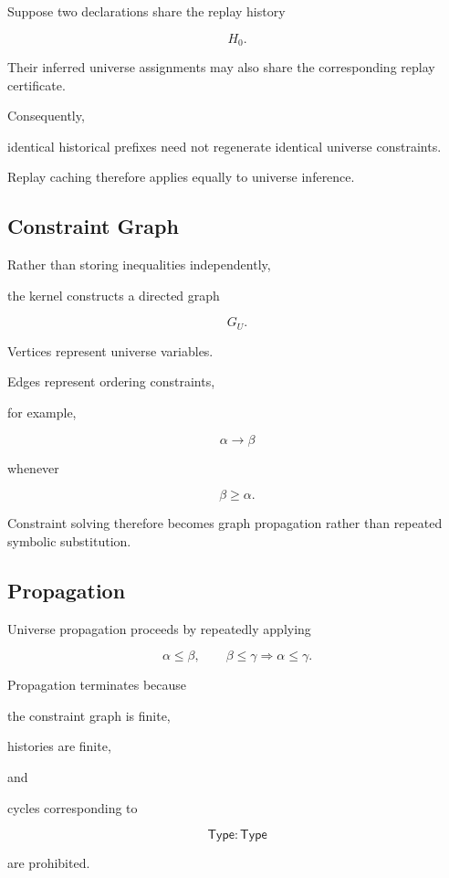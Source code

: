 \documentclass[12pt,oneside]{article}
\theoremstyle{definition}
\theoremstyle{remark}
\newcommand{\Type}{\mathsf{Type}}
\begin{document}
Suppose two declarations share the replay history

\[
H_0.
\]

Their inferred universe assignments may also share the corresponding replay
certificate.

Consequently,

identical historical prefixes need not regenerate identical universe
constraints.

Replay caching therefore applies equally to universe inference.


\subsection{Constraint Graph}

Rather than storing inequalities independently,

the kernel constructs a directed graph

\[
G_U.
\]

Vertices represent universe variables.

Edges represent ordering constraints,

for example,

\[
\alpha
\rightarrow
\beta
\]

whenever

\[
\beta
\geq
\alpha.
\]

Constraint solving therefore becomes graph propagation rather than repeated
symbolic substitution.


\subsection{Propagation}

Universe propagation proceeds by repeatedly applying

\[
\alpha
\leq
\beta,
\qquad
\beta
\leq
\gamma
\Longrightarrow
\alpha
\leq
\gamma.
\]

Propagation terminates because

the constraint graph is finite,

histories are finite,

and

cycles corresponding to

\[
\Type
:
\Type
\]

are prohibited.
\end{document}
